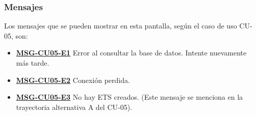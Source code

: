 \subsubsection{Mensajes}
Los mensajes que se pueden mostrar en esta pantalla, según el caso de uso CU-05, son:
\begin{itemize}
	\item \textbf{\hyperref[msg:CU05-E1]{MSG-CU05-E1}} Error al consultar la base de datos. Intente nuevamente más tarde.
	\item \textbf{\hyperref[msg:CU05-E2]{MSG-CU05-E2}} Conexión perdida.
	\item \textbf{\hyperref[msg:CU05-E3]{MSG-CU05-E3}} No hay ETS creados. (Este mensaje se menciona en la trayectoria alternativa A del CU-05).
\end{itemize}

